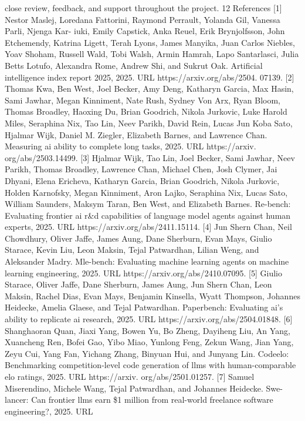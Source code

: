 close review, feedback, and support throughout the project.
12
References
[1] Nestor Maslej, Loredana Fattorini, Raymond Perrault, Yolanda Gil, Vanessa Parli, Njenga Kar-
iuki, Emily Capstick, Anka Reuel, Erik Brynjolfsson, John Etchemendy, Katrina Ligett, Terah
Lyons, James Manyika, Juan Carlos Niebles, Yoav Shoham, Russell Wald, Tobi Walsh, Armin
Hamrah, Lapo Santarlasci, Julia Betts Lotufo, Alexandra Rome, Andrew Shi, and Sukrut
Oak. Artificial intelligence index report 2025, 2025. URL https://arxiv.org/abs/2504.
07139.
[2] Thomas Kwa, Ben West, Joel Becker, Amy Deng, Katharyn Garcia, Max Hasin, Sami Jawhar,
Megan Kinniment, Nate Rush, Sydney Von Arx, Ryan Bloom, Thomas Broadley, Haoxing Du,
Brian Goodrich, Nikola Jurkovic, Luke Harold Miles, Seraphina Nix, Tao Lin, Neev Parikh,
David Rein, Lucas Jun Koba Sato, Hjalmar Wijk, Daniel M. Ziegler, Elizabeth Barnes, and
Lawrence Chan. Measuring ai ability to complete long tasks, 2025. URL https://arxiv.
org/abs/2503.14499.
[3] Hjalmar Wijk, Tao Lin, Joel Becker, Sami Jawhar, Neev Parikh, Thomas Broadley, Lawrence
Chan, Michael Chen, Josh Clymer, Jai Dhyani, Elena Ericheva, Katharyn Garcia, Brian
Goodrich, Nikola Jurkovic, Holden Karnofsky, Megan Kinniment, Aron Lajko, Seraphina Nix,
Lucas Sato, William Saunders, Maksym Taran, Ben West, and Elizabeth Barnes. Re-bench:
Evaluating frontier ai r\&d capabilities of language model agents against human experts, 2025.
URL https://arxiv.org/abs/2411.15114.
[4] Jun Shern Chan, Neil Chowdhury, Oliver Jaffe, James Aung, Dane Sherburn, Evan Mays,
Giulio Starace, Kevin Liu, Leon Maksin, Tejal Patwardhan, Lilian Weng, and Aleksander
Madry. Mle-bench: Evaluating machine learning agents on machine learning engineering,
2025. URL https://arxiv.org/abs/2410.07095.
[5] Giulio Starace, Oliver Jaffe, Dane Sherburn, James Aung, Jun Shern Chan, Leon Maksin,
Rachel Dias, Evan Mays, Benjamin Kinsella, Wyatt Thompson, Johannes Heidecke, Amelia
Glaese, and Tejal Patwardhan. Paperbench: Evaluating ai’s ability to replicate ai research,
2025. URL https://arxiv.org/abs/2504.01848.
[6] Shanghaoran Quan, Jiaxi Yang, Bowen Yu, Bo Zheng, Dayiheng Liu, An Yang, Xuancheng
Ren, Bofei Gao, Yibo Miao, Yunlong Feng, Zekun Wang, Jian Yang, Zeyu Cui, Yang Fan,
Yichang Zhang, Binyuan Hui, and Junyang Lin. Codeelo: Benchmarking competition-level
code generation of llms with human-comparable elo ratings, 2025. URL https://arxiv.
org/abs/2501.01257.
[7] Samuel Miserendino, Michele Wang, Tejal Patwardhan, and Johannes Heidecke. Swe-lancer:
Can frontier llms earn \$1 million from real-world freelance software engineering?, 2025. URL
